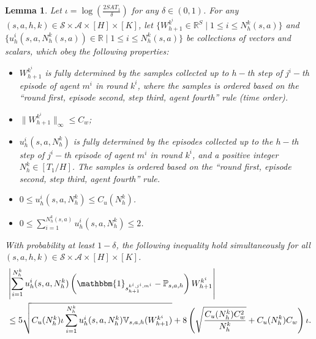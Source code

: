 \documentclass{article}
\newtheorem{lemma}{Lemma}[section]
\newcommand{\sah}{\mathcal{S} \times \mathcal{A} \times [H]}
\begin{document}
\begin{lemma}
\label{applyfree}
Let $\iota = \log(\frac{2SAT_1}{\delta})$ for any $\delta \in (0,1)$. For any $(s,a,h,k) \in \mathcal{S}\times \mathcal{A} \times [H]\times[K]$, let $\{W_{h+1}^{k^i} \in \mathbb{R}^{S} \mid 1 \leq i \leq N_h^k(s,a)\}$ and $\{u_h^i(s,a,N_h^k(s,a))\in \mathbb{R} \mid 1 \leq i \leq N_h^k(s,a)\}$ be collections of vectors and scalars, which obey the following properties:
\begin{itemize}
    \item $W_{h+1}^{k^i}$ is fully determined by the samples collected up to $h-$th step of $j^i-$th episode of agent $m^i$ in round $k^i$, where the samples is ordered based on the ``round first, episode second, step third, agent fourth” rule (time order).
    \item $\|W_{h+1}^{k^i}\|_\infty \leq C_w$;
    \item $u_h^i(s,a,N_h^k)$ is fully determined by the episodes collected up to the $h-$th step of $j^i-$th episode of agent $m^i$ in round $k^i$, and a positive integer $N_h^k \in [T_1/H]$. The samples is ordered based on the ``round first, episode second, step third, agent fourth” rule.
    \item $0 \leq u_h^i(s,a,N_h^k) \leq C_u(N_h^k)$.
    \item $0 \leq \sum_{i=1}^{N^k_h(s,a)} u_h^i(s,a,N_h^k) \leq 2$.
\end{itemize}
With probability at least $1-\delta$, the following inequality hold simultaneously for all $(s,a,h,k) \in \sah \times [K]$.
\begin{align*}
    &\left|\sum_{i=1} ^{N_h^k} u_h^i(s,a,N_h^k) \left(\mathbbm{1}_{s_{h+1}^{k^i,j^i,m^i}} - \mathbb{P}_{s,a,h}\right)W_{h+1}^{k^i}\right| \\
    &\leq 5\sqrt{C_u(N_h^k)\iota \sum_{i=1}^{N_h^k} u_h^i(s,a,N_h^k)  \mathbb{V}_{s,a,h}(W_{h+1}^{k^i})} + 8\left(\sqrt{\frac{C_u(N_h^k)C_w^2}{N_h^k}}+C_u(N_h^k)C_w\right)\iota.
\end{align*}

\end{lemma}
\end{document}
